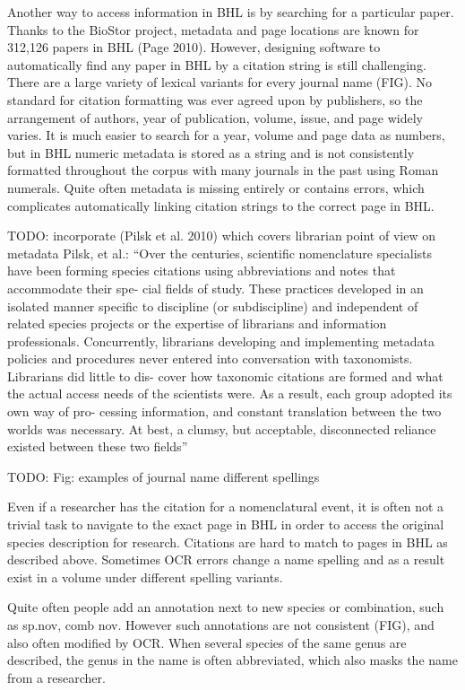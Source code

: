 \documentclass[
]{article}
\begin{document}
Another way to access information in BHL is by searching for a
particular paper. Thanks to the BioStor project, metadata and page
locations are known for 312,126 papers in BHL (Page 2010). However,
designing software to automatically find any paper in BHL by a citation
string is still challenging. There are a large variety of lexical
variants for every journal name (FIG). No standard for citation
formatting was ever agreed upon by publishers, so the arrangement of
authors, year of publication, volume, issue, and page widely varies. It
is much easier to search for a year, volume and page data as numbers,
but in BHL numeric metadata is stored as a string and is not
consistently formatted throughout the corpus with many journals in the
past using Roman numerals. Quite often metadata is missing entirely or
contains errors, which complicates automatically linking citation
strings to the correct page in BHL.

TODO: incorporate (Pilsk et al. 2010) which covers librarian point of
view on metadata Pilsk, et al.: ``Over the centuries, scientific
nomenclature specialists have been forming species citations using
abbreviations and notes that accommodate their spe- cial fields of
study. These practices developed in an isolated manner specific to
discipline (or subdiscipline) and independent of related species
projects or the expertise of librarians and information professionals.
Concurrently, librarians developing and implementing metadata policies
and procedures never entered into conversation with taxonomists.
Librarians did little to dis- cover how taxonomic citations are formed
and what the actual access needs of the scientists were. As a result,
each group adopted its own way of pro- cessing information, and constant
translation between the two worlds was necessary. At best, a clumsy, but
acceptable, disconnected reliance existed between these two fields''

TODO: Fig: examples of journal name different spellings

Even if a researcher has the citation for a nomenclatural event, it is
often not a trivial task to navigate to the exact page in BHL in order
to access the original species description for research. Citations are
hard to match to pages in BHL as described above. Sometimes OCR errors
change a name spelling and as a result exist in a volume under different
spelling variants.

Quite often people add an annotation next to new species or combination,
such as sp.nov, comb nov. However such annotations are not consistent
(FIG), and also often modified by OCR. When several species of the same
genus are described, the genus in the name is often abbreviated, which
also masks the name from a researcher.
\end{document}
